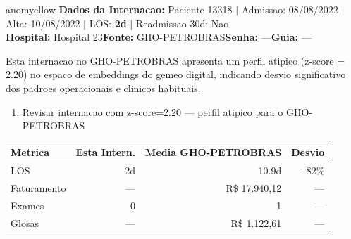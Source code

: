 \documentclass[a4paper,10pt]{article}
\begin{document}
\begin{anomalycard}[Internacao 14296 | GHO-PETROBRAS | MODERADO (z=2.20)]{anomyellow}
\textbf{Dados da Internacao:} Paciente 13318 $\mid$ Admissao: 08/08/2022 $\mid$ Alta: 10/08/2022 $\mid$ LOS: \textbf{2d} $\mid$ Readmissao 30d: Nao\\
\textbf{Hospital:} Hospital 23\quad\textbf{Fonte:} GHO-PETROBRAS\quad\textbf{Senha:} ---\quad\textbf{Guia:} ---\\
\vspace{2pt}\begin{tcolorbox}[colback=severityred!20,colframe=anomyellow,title={\textbf{Interpretacao de Negocio}},fonttitle=\bfseries\small,left=4pt,right=4pt,top=3pt,bottom=3pt]
{\small Esta internacao no GHO-PETROBRAS apresenta um perfil atipico (z-score = 2.20) no espaco de embeddings do gemeo digital, indicando desvio significativo dos padroes operacionais e clinicos habituais.}
\end{tcolorbox}
\begin{tcolorbox}[colback=severityyellow!30,colframe=anomorange,title={\textbf{Recomendacoes Especificas}},fonttitle=\bfseries\small,left=4pt,right=4pt,top=3pt,bottom=3pt]
\begin{enumerate}[nosep,leftmargin=16pt]
\item {\small Revisar internacao com z-score=2.20 --- perfil atipico para o GHO-PETROBRAS}
\end{enumerate}
\end{tcolorbox}
\begin{center}\begin{tabular}{l r r r}\toprule\textbf{Metrica} & \textbf{Esta Intern.} & \textbf{Media GHO-PETROBRAS} & \textbf{Desvio} \\\midrule
LOS & 2d & 10.9d & -82\% \\
Faturamento & --- & R\$ 17.940,12 & --- \\
Exames & 0 & 1 & --- \\
Glosas & --- & R\$ 1.122,61 & --- \\
\bottomrule\end{tabular}\end{center}


\end{anomalycard}
\end{document}

